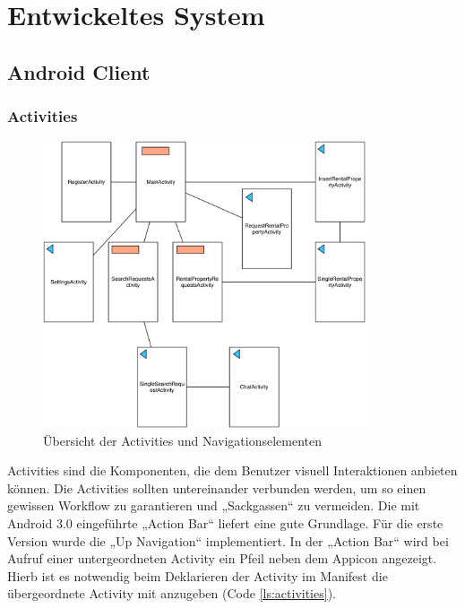 
\section{Entwickeltes System}

\subsection{Android Client}

\subsubsection{Activities}

\begin{figure}[H]
	\centering
	\includegraphics[width=0.85\textwidth]{./images/activitiesoverview.png}
	\caption{Übersicht der Activities und Navigationselementen}
	\label{fg:activitiesoverview}
\end{figure}

Activities sind die Komponenten, die dem Benutzer visuell Interaktionen anbieten können. Die Activities sollten untereinander verbunden werden, um so einen gewissen Workflow zu garantieren und „Sackgassen“ zu vermeiden. Die mit Android 3.0 eingeführte „Action Bar“ liefert eine gute Grundlage. Für die erste Version wurde die „Up Navigation“ implementiert. In der „Action Bar“ wird bei Aufruf einer untergeordneten Activity ein Pfeil neben dem Appicon angezeigt. Hierb ist es notwendig beim Deklarieren der Activity im Manifest die übergeordnete Activity mit anzugeben (Code \ref{ls:activities}).

